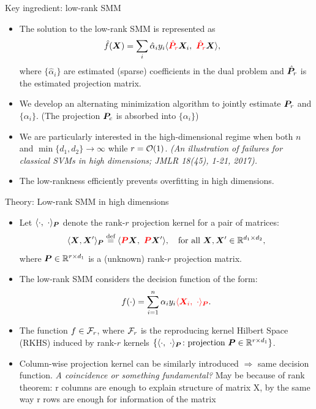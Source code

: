 \documentclass[compress,dvipsnames]{beamer}
\let\olditem\item
\renewcommand\item{\olditem\justifying}
\begin{document}
\begin{frame}{Key ingredient: low-rank SMM}
\begin{itemize}
\item The solution to the low-rank SMM is represented as
\begin{align}
\hat f(\bm{X})&=\sum_{i}\hat \alpha_i y_i\langle {\color{red}\hat {\bm{P}}_r}\bm{X}_i,\ {\color{red}\hat {\bm{P}}_r }\bm{X} \rangle,
\end{align}
where $\{\hat \alpha_i\}$ are estimated (sparse) coefficients in the dual problem and $\hat {\bm{P}}_r$ is the estimated projection matrix. 
\item We develop an alternating minimization algorithm to jointly estimate $\bm{P}_r$ and $\{\alpha_i\}$. (The projection $\bm{P}_c$ is absorbed into $\{\alpha_i\}$)
\item We are particularly interested in the high-dimensional regime when both $n$ and $\min\{d_1,d_2\}\to \infty$ while $r={\mathcal O}(1)$. {\it \scriptsize(An illustration of failures for classical SVMs in high dimensions; JMLR 18(45), 1-21, 2017).} 
\item The {\color{red}low-rankness} efficiently prevents overfitting in high dimensions.
 \end{itemize}
\end{frame}

\begin{frame}{Theory: Low-rank SMM in high dimensions}

\begin{itemize}
\item Let $\langle \cdot,\ \cdot \rangle_{\bm{P}}$ denote the rank-$r$ projection kernel for a pair of matrices:
\[
\langle \bm{X}, \bm{X}' \rangle_{\bm{P}}\stackrel{\text{def}}{=} \langle {\color{red}\bm{P}} \bm{X},\ {\color{red}\bm{P}} \bm{X}'\rangle, \quad \text{for all }\bm{X}, \bm{X}'\in\mathbb{R}^{d_1\times d_2},
\]
where $\bm{P}\in \mathbb{R}^{r\times d_1}$ is a (unknown) rank-$r$ projection matrix.
\item The low-rank SMM considers the decision function of the form:
\begin{align}\label{eq:f}
f(\cdot)=\sum_{i=1}^n \alpha_i y_i {\color{red}\langle \bm{X}_i,\ \cdot \rangle_{\bm{P}}}.
\end{align}
\item The function $f\in {\mathcal F}_r$, where ${\mathcal F}_r$ is the reproducing kernel Hilbert Space (RKHS) induced by rank-$r$ kernels $\{\langle \cdot,\ \cdot\rangle_{\bm{P}}\colon {\text{projection }} \bm{P}\in\mathbb{R}^{r\times d_1}\}$. 
\item Column-wise projection kernel can be similarly introduced $\Rightarrow$ same decision function. {\it A coincidence or something fundamental?} {\color{blue} May be because of rank theorem: r columns are enough to explain structure of  matrix X, by the same way r rows are enough for information of the matrix}
\end{itemize}
\end{frame}
\end{document}
